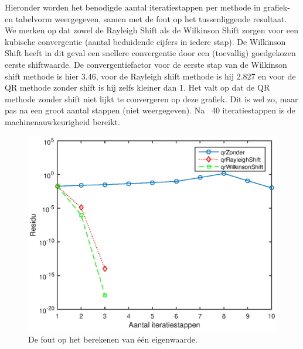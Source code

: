 \documentclass[]{article}
\begin{document}
Hieronder worden het benodigde aantal iteratiestappen per methode in grafiek- en tabelvorm weergegeven, samen met de fout op het tussenliggende resultaat. We merken op dat  zowel de Rayleigh Shift als de Wilkinson Shift zorgen voor een kubische convergentie (aantal beduidende cijfers  in iedere stap). 
De Wilkinson Shift heeft in dit geval een snellere convergentie door een (toevallig) goedgekozen eerste shiftwaarde. De convergentiefactor voor de eerste stap van de Wilkinson shift methode is hier $3.46$, voor de Rayleigh shift methode is hij $2.827$ en voor de QR methode zonder shift is hij zelfs kleiner dan 1. Het valt op dat de QR methode zonder shift niet lijkt te convergeren op deze grafiek. Dit is wel zo, maar pas na een groot aantal stappen (niet weergegeven). Na ~40 iteratiestappen is de machinenauwkeurigheid bereikt. 

\begin{figure}
\begin{center}
\includegraphics[width=1.4\textwidth]{opgave4.eps}
\end{center}
\caption{De fout op het berekenen van \'e\'en eigenwaarde.}
\label{figuurtje}
\end{figure}

\begin{table}
\noindent{}
\caption{convergentie QR methodes voor eigenwaardenberekening}
\label{tabelOpgave4}
\end{table}
\end{document}
